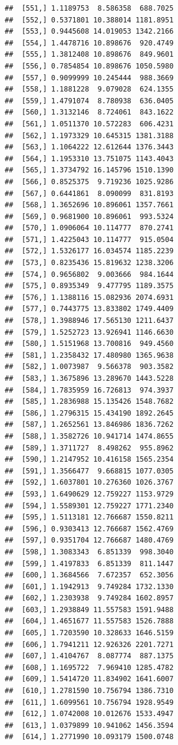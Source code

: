 \documentclass[article]{jss}\usepackage[]{graphicx}\usepackage[]{xcolor}
\makeatletter
\newenvironment{kframe}{%
 \def\at@end@of@kframe{}%
 \ifinner\ifhmode%
  \def\at@end@of@kframe{\end{minipage}}%
  \begin{minipage}{\columnwidth}%
 \fi\fi%
 \def\FrameCommand##1{\hskip\@totalleftmargin \hskip-\fboxsep
 \colorbox{shadecolor}{##1}\hskip-\fboxsep
     \hskip-\linewidth \hskip-\@totalleftmargin \hskip\columnwidth}%
 \MakeFramed {\advance\hsize-\width
   \@totalleftmargin\z@ \linewidth\hsize
   \@setminipage}}%
 {\par\unskip\endMakeFramed%
 \at@end@of@kframe}
\newenvironment{knitrout}{}{} %
\makeatother
\begin{document}
\begin{knitrout}
\begin{kframe}
\begin{verbatim}
##  [551,] 1.1189753  8.586358  688.7025
##  [552,] 0.5371801 10.388014 1181.8951
##  [553,] 0.9445608 14.019053 1342.2166
##  [554,] 1.4478716 10.898676  920.4749
##  [555,] 1.3812408 10.898676  849.9601
##  [556,] 0.7854854 10.898676 1050.5980
##  [557,] 0.9099999 10.245444  988.3669
##  [558,] 1.1881228  9.079028  624.1355
##  [559,] 1.4791074  8.780938  636.0405
##  [560,] 1.3132146  8.724061  843.1622
##  [561,] 1.0511370 10.572283  606.4231
##  [562,] 1.1973329 10.645315 1381.3188
##  [563,] 1.1064222 12.612644 1376.3443
##  [564,] 1.1953310 13.751075 1143.4043
##  [565,] 1.3734792 16.145796 1510.1390
##  [566,] 0.8525375  9.719236 1025.9286
##  [567,] 0.6441861  8.090099  831.8193
##  [568,] 1.3652696 10.896061 1357.7661
##  [569,] 0.9681900 10.896061  993.5324
##  [570,] 1.0906064 10.114777  870.2741
##  [571,] 1.4225043 10.114777  915.0504
##  [572,] 1.5326177 16.034574 1185.2239
##  [573,] 0.8235436 15.819632 1238.3206
##  [574,] 0.9656802  9.003666  984.1644
##  [575,] 0.8935349  9.477795 1189.3575
##  [576,] 1.1388116 15.082936 2074.6931
##  [577,] 0.7443775 13.833802 1749.4409
##  [578,] 1.3988946 17.565130 1211.6437
##  [579,] 1.5252723 13.926941 1146.6630
##  [580,] 1.5151968 13.700816  949.4560
##  [581,] 1.2358432 17.480980 1365.9638
##  [582,] 1.0073987  9.566378  903.3582
##  [583,] 1.3675896 13.289670 1443.5228
##  [584,] 1.7835959 16.726813  974.3937
##  [585,] 1.2836988 15.135426 1548.7682
##  [586,] 1.2796315 15.434190 1892.2645
##  [587,] 1.2652561 13.846986 1836.7262
##  [588,] 1.3582726 10.941714 1474.8655
##  [589,] 1.3711727  8.498262  955.8962
##  [590,] 1.2147952 10.416158 1565.2354
##  [591,] 1.3566477  9.668815 1077.0305
##  [592,] 1.6037801 10.276360 1026.3767
##  [593,] 1.6490629 12.759227 1153.9729
##  [594,] 1.5589301 12.759227 1771.2340
##  [595,] 1.5113181 12.766687 1550.8211
##  [596,] 0.9303413 12.766687 1562.4769
##  [597,] 0.9351704 12.766687 1480.4769
##  [598,] 1.3083343  6.851339  998.3040
##  [599,] 1.4197833  6.851339  811.1447
##  [600,] 1.3684566  7.672357  652.3056
##  [601,] 1.1942913  9.749284 1732.1330
##  [602,] 1.2303938  9.749284 1602.8957
##  [603,] 1.2938849 11.557583 1591.9488
##  [604,] 1.4651677 11.557583 1526.7888
##  [605,] 1.7203590 10.328633 1646.5159
##  [606,] 1.7941211 12.926326 2201.7271
##  [607,] 1.4104767  8.087774  887.1375
##  [608,] 1.1695722  7.969410 1285.4782
##  [609,] 1.5414720 11.834902 1641.6007
##  [610,] 1.2781590 10.756794 1386.7310
##  [611,] 1.6099561 10.756794 1928.9549
##  [612,] 1.0742008 10.012676 1533.4947
##  [613,] 1.0379899 10.941062 1456.3594
##  [614,] 1.2771990 10.093179 1500.0748

\end{verbatim}
\end{kframe}
\end{knitrout}
\end{document}
